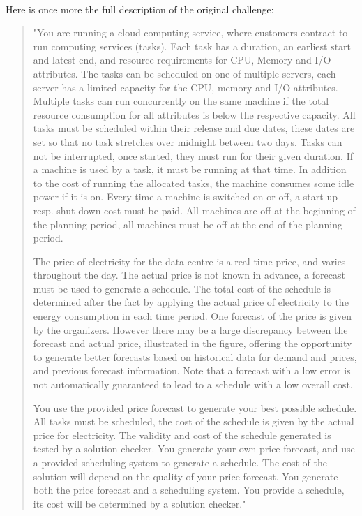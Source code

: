 \documentclass[a4,12pt]{article}
\begin{document}
\paragraph{}
Here is once more the full description of the original challenge:
\begin{quotation}
"You are running a cloud computing service, where customers contract to run computing services (tasks). Each task has a duration, an earliest start and latest end, and resource requirements for CPU, Memory and I/O attributes. The tasks can be scheduled on one of multiple servers, each server has a limited capacity for the CPU, memory and I/O attributes. Multiple tasks can run concurrently on the same machine if the total resource consumption for all attributes is below the respective capacity. All tasks must be scheduled within their release and due dates, these dates are set so that no task stretches over midnight between two days. Tasks can not be interrupted, once started, they must run for their given duration. If a machine is used by a task, it must be running at that time. In addition to the cost of running the allocated tasks, the machine consumes some idle power if it is on. Every time a machine is switched on or off, a start-up resp. shut-down cost must be paid. All machines are off at the beginning of the planning period, all machines must be off at the end of the planning period.

The price of electricity for the data centre is a real-time price, and varies throughout the day. The actual price is not known in advance, a forecast must be used to generate a schedule. The total cost of the schedule is determined after the fact by applying the actual price of electricity to the energy consumption in each time period. One forecast of the price is given by the organizers. However there may be a large discrepancy between the forecast and actual price, illustrated in the figure, offering the opportunity to generate better forecasts based on historical data for demand and prices, and previous forecast information. Note that a forecast with a low error is not automatically guaranteed to lead to a schedule with a low overall cost.

You use the provided price forecast to generate your best possible schedule. All tasks must be scheduled, the cost of the schedule is given by the actual price for electricity. The validity and cost of the schedule generated is tested by a solution checker. You generate your own price forecast, and use a provided scheduling system to generate a schedule. The cost of the solution will depend on the quality of your price forecast. You generate both the price forecast and a scheduling system. You provide a schedule, its cost will be determined by a solution checker."
\end{quotation}
\end{document}
